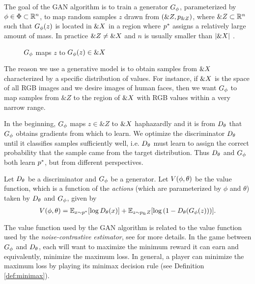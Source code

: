 The goal of the GAN algorithm is to train a generator $G_\phi$, parameterized by
$\phi \in \Phi \subset \mathbb{R}^n$, to map random samples $z$ drawn from $(\&Z,
p_{\&Z})$, where $\&Z \subset \mathbb{R}^n$ such that $G_\phi(z)$ is located in
$\&X$ in a region where $p^*$ assigns a relatively large amount of mass. In
practice $\&Z \not = \&X$ and $n$ is usually smaller than $|\&X|$
\cite{ref:arjovsky-2017}.

\begin{figure}[H]
  \centering
  \caption{$G_\phi$ maps $z$ to $G_\phi(z) \in \&X$}%
  \label{fig:g-maps}
\end{figure}

The reason we use a generative model is to obtain samples from $\&X$
characterized by a specific distribution of values. For instance, if $\&X$
is the space of all RGB images and we desire images of human faces, then we want
$G_\phi$ to map samples from $\&Z$ to the region of $\&X$ with RGB values within
a very narrow range.

In the beginning, $G_\phi$ maps $z \in \&Z$ to $\&X$ haphazardly and it is from
$D_\theta$ that $G_\phi$ obtains gradients from which to learn. We optimize the
discriminator $D_\theta$ until it classifies samples sufficiently well, i.e. $D_\theta$ must
learn to assign the correct probability that the sample came from the target
distribution. Thus $D_\theta$ and $G_\phi$ both learn $p^*$, but from different
perspectives.

Let $D_\theta$ be a discriminator and $G_\phi$ be a generator. Let $V(\phi, \theta)$ be the value
function, which is a function of the \textit{actions} (which are parameterized
by $\phi$ and $\theta$) taken by $D_\theta$ and $G_\phi$, given by
\begin{align}
  \label{eq:the-original-objective-function}
  V(\phi, \theta) = \mathbb{E}_{x \sim p^*}[{\log D_\theta(x})] +
  \mathbb{E}_{z \sim p_\&Z}[\log{(1 - D_\theta(G_\phi(z)))}].
\end{align}

The value function used by the GAN algorithm is related to the value
function used by the \textit{noise-contrastive estimator}, see
\cite{ref:gutmann-2010} for more details. In the game between $G_\phi$ and
$D_\theta$, each will want to maximize the minimum reward it can earn and
equivalently, minimize the maximum loss. In general, a player can
minimize the maximum loss by playing its minimax decision rule (see
Definition \ref{def:minimax}).

